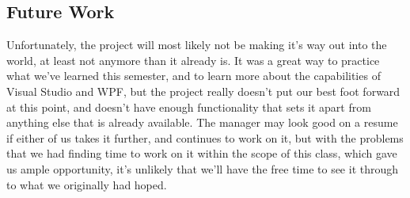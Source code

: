 \documentclass[10pt,conference,onecolumn,compsoc]{IEEEtran}
\begin{document}
\subsection{Future Work}
Unfortunately, the project will most likely not be making it's way out into the world, at least not anymore than it already is. It was a great way to practice what we've learned this semester, and to learn more about the capabilities of Visual Studio and WPF, but the project really doesn't put our best foot forward at this point, and doesn't have enough functionality that sets it apart from anything else that is already available. The manager may look good on a resume if either of us takes it further, and continues to work on it, but with the problems that we had finding time to work on it within the scope of this class, which gave us ample opportunity, it's unlikely that we'll have the free time to see it through to what we originally had hoped.

\end{document}
